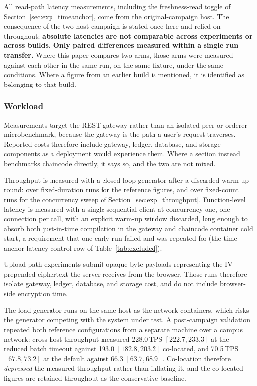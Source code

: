 \documentclass[preprint,12pt]{elsarticle}
\begin{document}
All read-path latency measurements, including the freshness-read toggle of
Section~\ref{sec:exp_timeanchor}, come from the original-campaign host. The
consequence of the two-host campaign is stated once here
and relied on throughout: \textbf{absolute
latencies are not comparable across experiments or across builds. Only paired
differences measured within a single run transfer.} Where this paper compares
two arms, those arms were measured against each other in the same run, on the
same fixture, under the same conditions. Where a figure from an earlier build is
mentioned, it is identified as belonging to that build.

\subsubsection*{Workload}

Measurements target the REST gateway rather than an isolated peer or orderer
microbenchmark, because the gateway is the path a user's request
traverses. Reported costs therefore include gateway, ledger, database, and
storage components as a deployment would experience them. Where a section instead
benchmarks chaincode directly, it says so, and the two are not mixed.

Throughput is measured with a closed-loop generator after a discarded warm-up
round: over fixed-duration runs for the reference figures, and over fixed-count
runs for the concurrency sweep of Section~\ref{sec:exp_throughput}. Function-level latency is measured with a
single sequential client at concurrency one, one connection per call, with an
explicit warm-up window discarded, long enough to absorb both just-in-time
compilation in the gateway and chaincode container cold start, a requirement
that one early run failed and was repeated for
(the time-anchor latency control row of Table~\ref{tab:excluded}).

Upload-path experiments submit opaque byte payloads representing the
IV-prepended ciphertext the server receives from the browser. Those runs
therefore isolate gateway, ledger, database, and storage cost, and do not
include browser-side encryption time.

The load generator runs on the same host as the network containers, which risks
the generator competing with the system under test. A post-campaign validation
repeated both reference configurations from a separate machine over a campus
network: cross-host throughput measured 228.0\,TPS $[222.7, 233.3]$ at the
reduced batch timeout against 193.0 $[182.8, 203.2]$ co-located, and 70.5\,TPS
$[67.8, 73.2]$ at the default against 66.3 $[63.7, 68.9]$. Co-location therefore
\emph{depressed} the measured throughput rather than inflating it, and the
co-located figures are retained throughout as the conservative baseline.
\end{document}
